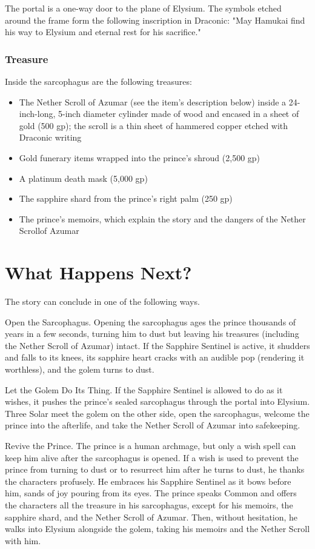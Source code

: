 \documentclass[10pt,a4paper,twoside,bg=print,twocolumn,openany,nodeprecatedcode]{dndbook}
\begin{document}
The portal is a one-way door to the plane of Elysium. The symbols etched around the frame form the following inscription in Draconic: "May Hamukai find his way to Elysium and eternal rest for his sacrifice."

\subsubsection{Treasure}
Inside the sarcophagus are the following treasures:


\begin{itemize}
\item The Nether Scroll of Azumar (see the item's description below) inside a 24-inch-long, 5-inch diameter cylinder made of wood and encased in a sheet of gold (500 gp); the scroll is a thin sheet of hammered copper etched with Draconic writing
\item Gold funerary items wrapped into the prince's shroud (2,500 gp)
\item A platinum death mask (5,000 gp)
\item The sapphire shard from the prince's right palm (250 gp)
\item The prince's memoirs, which explain the story and the dangers of the Nether Scrollof Azumar
\end{itemize}

\section{What Happens Next?}
The story can conclude in one of the following ways.

Open the Sarcophagus. Opening the sarcophagus ages the prince thousands of years in a few seconds, turning him to dust but leaving his treasures (including the Nether Scroll of Azumar) intact. If the Sapphire Sentinel is active, it shudders and falls to its knees, its sapphire heart cracks with an audible pop (rendering it worthless), and the golem turns to dust.

Let the Golem Do Its Thing. If the Sapphire Sentinel is allowed to do as it wishes, it pushes the prince's sealed sarcophagus through the portal into Elysium. Three Solar meet the golem on the other side, open the sarcophagus, welcome the prince into the afterlife, and take the Nether Scroll of Azumar into safekeeping.

Revive the Prince. The prince is a human archmage, but only a wish spell can keep him alive after the sarcophagus is opened. If a wish is used to prevent the prince from turning to dust or to resurrect him after he turns to dust, he thanks the characters profusely. He embraces his Sapphire Sentinel as it bows before him, sands of joy pouring from its eyes. The prince speaks Common and offers the characters all the treasure in his sarcophagus, except for his memoirs, the sapphire shard, and the Nether Scroll of Azumar. Then, without hesitation, he walks into Elysium alongside the golem, taking his memoirs and the Nether Scroll with him.
\end{document}
